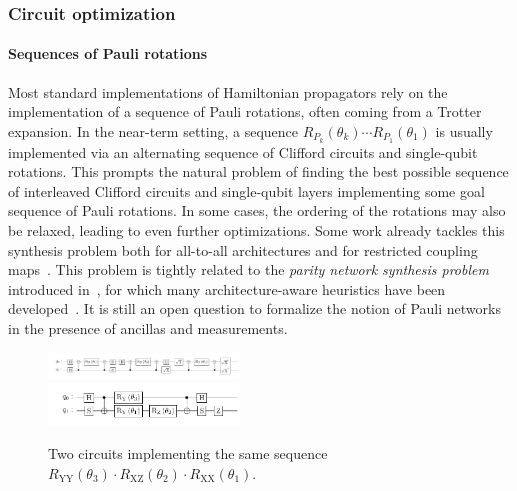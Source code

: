 \subsubsection{Circuit optimization}
\label{sec:Circ}
\paragraph{Sequences of Pauli rotations} Most standard implementations of Hamiltonian propagators rely on the implementation of a sequence of Pauli rotations, often coming from a Trotter expansion.
In the near-term setting, a sequence $R_{P_k}(\theta_k)\cdots R_{P_1}(\theta_1)$ is usually implemented via an alternating sequence of Clifford circuits and single-qubit rotations.
This prompts the natural problem of finding the best possible sequence of interleaved Clifford circuits and single-qubit layers implementing some goal sequence of Pauli rotations.
In some cases, the ordering of the rotations may also be relaxed, leading to even further optimizations.
Some work already tackles this synthesis problem both for all-to-all architectures and for restricted coupling maps~\cite{childs2018toward,nam2019low,nam2020trappedion,cowtan2020generic,wang2021resource, li2021software, martiel2022architecture,wang2023ever}.
This problem is tightly related to the \emph{parity network synthesis problem} introduced in~\cite{amy2018controlled}, for which many architecture-aware heuristics have been developed~\cite{vandaele2022phase,meijer2020architecture}. It is still an open question to formalize the notion of Pauli networks in the presence of ancillas and measurements. 

\begin{figure}
    \includegraphics[width=0.45\textwidth]{figures/pauli_rotations_bad.pdf}\\
    \includegraphics[width=0.45\textwidth]{figures/pauli_rotations_good.pdf}
    \caption{Two circuits implementing the same sequence $R_{\operatorname{YY}}(\theta_3)\cdot R_{\operatorname{XZ}}(\theta_2)\cdot R_{\operatorname{XX}}(\theta_1)$.}
    \label{fig:enter-label}
\end{figure}

